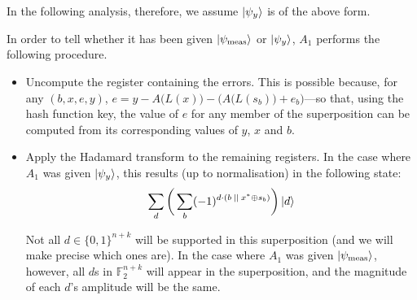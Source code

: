 \documentclass{article}
\begin{document}
In the following analysis, therefore, we assume $\ket{\psi_y}$ is of the above form.

In order to tell whether it has been given $\ket{\psi_{\mathrm{meas}}}$ or $\ket{\psi_y}$, $A_1$ performs the following procedure.
\begin{itemize}
    \item Uncompute the register containing the errors. This is possible because, for any $(b, x, e, y)$, $e = y - A\big( L(x) \big) - \big( A\big( L(s_b) \big) + e_b \big)$---so that, using the hash function key, the value of $e$ for any member of the superposition can be computed from its corresponding values of $y$, $x$ and $b$.
    \item Apply the Hadamard transform to the remaining registers. In the case where $A_1$ was given $\ket{\psi_y}$, this results (up to normalisation) in the following state:
    \begin{align}
        \sum_d \bigg( \sum_b (-1)^{d \cdot (b \: || \: x^* \oplus s_b)} \bigg) \ket{d}
    \end{align}

    Not all $d \in \{0,1\}^{n + k}$ will be supported in this superposition (and we will make precise which ones are). In the case where $A_1$ was given $\ket{\psi_{\mathrm{meas}}}$, however, all $d$s in $\mathbb{F}_2^{n+k}$ will appear in the superposition, and the magnitude of each $d$'s amplitude will be the same.


\end{itemize}
\end{document}
